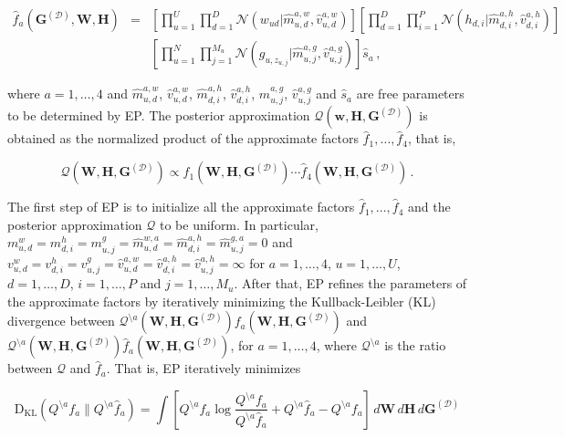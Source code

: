 \begin{eqnarray}
\hat{f}_a(\mathbf{G}^{(\mathcal{D})},\mathbf{W},\mathbf{H}) & = &
\left[\prod_{u=1}^{U}\prod_{d=1}^{D}\mathcal{N}(w_{ud}|\hat{m}_{u,d}^{a,w},\hat{v}_{u,d}^{a,w})\right]
\left[\prod_{d=1}^{D}\prod_{i=1}^{P} \mathcal{N}(h_{d,i}|\hat{m}_{d,i}^{a,h},\hat{v}_{d,i}^{a,h})\right]\nonumber\\
& & \left[\prod_{u=1}^N \prod_{j=1}^{M_u} \mathcal{N}(g_{u,z_{u,j}}|\hat{m}_{u,j}^{a,g},\hat{v}_{u,j}^{a,g})\right] \hat{s}_a\,,
\end{eqnarray}

where $a=1,\ldots,4$ and $\hat{m}_{u,d}^{a,w}$, $\hat{v}_{u,d}^{a,w}$, $\hat{m}_{d,i}^{a,h}$, $\hat{v}_{d,i}^{a,h}$,
$\hat{m}_{u,j}^{a,g}$, $\hat{v}_{u,j}^{a,g}$ and $\hat{s}_a$ are free parameters to be determined by EP. 
The posterior approximation $\mathcal{Q}(\mathbf{w},\mathbf{H},\mathbf{G}^{(\mathcal{D})})$
is obtained as the normalized product of the approximate factors $\hat{f}_{1},\ldots,\hat{f}_{4}$, that is,

\begin{equation}
\mathcal{Q}(\mathbf{W},\mathbf{H},\mathbf{G}^{(\mathcal{D})}) \propto
\hat{f}_{1}(\mathbf{W},\mathbf{H},\mathbf{G}^{(\mathcal{D})})\cdots\hat{f}_{4}(\mathbf{W},\mathbf{H},\mathbf{G}^{(\mathcal{D})})\,.
\end{equation}

The first step of EP is to initialize all the approximate factors $\hat{f}_1,\ldots,\hat{f}_4$ and the posterior approximation $\mathcal{Q}$ to be uniform.
In particular,
$m_{u,d}^w=m_{d,i}^h=m_{u,j}^g=\hat{m}_{u,d}^{w,a}=\hat{m}_{d,i}^{a,h}=\hat{m}_{u,j}^{g,a}=0$ and 
$v_{u,d}^w = v_{d,i}^h = v_{u,j}^g = \hat{v}_{u,d}^{a,w} = \hat{v}_{d,i}^{a,h} = \hat{v}_{u,j}^{a,h} = \infty$ for
$a=1,\ldots,4$, $u=1,\ldots,U$, $d=1,\ldots,D$, $i=1,\ldots,P$ and $j = 1,\ldots,M_u$.
After that, EP refines the parameters of the approximate factors by iteratively minimizing the Kullback-Leibler (KL) divergence
between $\mathcal{Q}^{\setminus a}(\mathbf{W},\mathbf{H},\mathbf{G}^{(\mathcal{D})})f_a(\mathbf{W},\mathbf{H},\mathbf{G}^{(\mathcal{D})})$
and $\mathcal{Q}^{\setminus a}(\mathbf{W},\mathbf{H},\mathbf{G}^{(\mathcal{D})})\hat{f}_a(\mathbf{W},\mathbf{H},\mathbf{G}^{(\mathcal{D})})$, for $a=1,\ldots,4$,
where $\mathcal{Q}^{\setminus a}$ is the ratio between $\mathcal{Q}$ and $\hat{f}_a$. That is, EP iteratively minimizes

\begin{equation} 
\text{D}_{\text{KL}}(Q^{\setminus a}f_a\|Q^{\setminus a}\hat{f}_a) 
= \int \left[Q^{\setminus a}f_a \log \frac{Q^{\setminus a}f_a}{Q^{\setminus a}\hat{f}_a}+
Q^{\setminus a}\hat{f}_a-Q^{\setminus a}f_a\right]\,d\mathbf{W}\,d\mathbf{H}\,d\mathbf{G}^{(\mathcal{D})}\label{eq:KL}
\end{equation}

